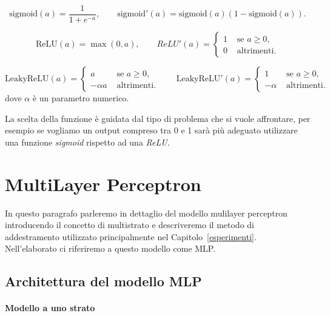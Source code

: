 \documentclass[11pt,a4paper,twoside,
openright]{book}
\begin{document}
\begin{equation}
\mathrm{sigmoid}(a) = \frac{1}{1+e^{-a}}, \qquad
\mathrm{sigmoid}'(a) = \mathrm{sigmoid}(a)(1-\mathrm{sigmoid}(a)).
\label{sigmoid}
\end{equation}

\begin{equation}
\mathrm{ReLU}(a) = \max(0,a), \qquad
ReLU'(a) = \begin{cases}
1 &\text{ se } a\geq0, \\
0 &\text{ altrimenti}.
\end{cases}
\label{relu}
\end{equation}

\begin{equation}
\mathrm{LeakyReLU}(a) = \begin{cases}
a &\text{ se } a\geq0, \\
- \alpha a &\text{ altrimenti}.
\end{cases} \qquad
\mathrm{LeakyReLU}'(a) = \begin{cases}
1 &\text{ se } a\geq0, \\
-\alpha &\text{ altrimenti}.
\end{cases}
\label{lrelu}
\end{equation}
dove $\alpha$ è un parametro numerico.

La scelta della funzione è guidata dal tipo di problema che si vuole affrontare, per esempio se vogliamo un output compreso tra 0 e 1 sarà più adeguato utilizzare una funzione \textit{sigmoid} rispetto ad una \textit{ReLU}.



\section{MultiLayer Perceptron}
In questo paragrafo parleremo in dettaglio del modello mulilayer perceptron introducendo il concetto di multistrato e descriveremo il metodo di addestramento utilizzato principalmente nel Capitolo~\ref{esperimenti}. Nell’elaborato ci riferiremo a questo modello come MLP.
\subsection{Architettura del modello MLP}
\label{archmlp}
\paragraph{Modello a uno strato}
\def\layersep{2.5cm}
\end{document}
